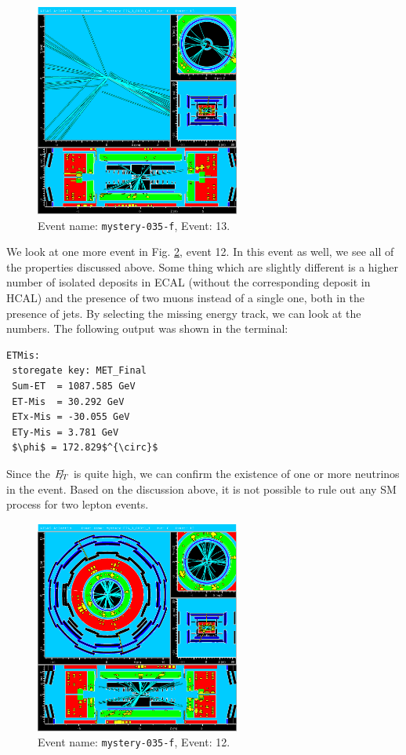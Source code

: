 \documentclass[a4paper]{report}
\numberwithin{equation}{section}
\begin{document}
\begin{figure}[htpb]
    \centering
    \includegraphics[width=0.6\textwidth]{mystery-035_0_00013_f-YX-RZ-RZ-YX-2022-05-23-13-34-34}
    \caption{Event name: \texttt{mystery-035-f}, Event: 13.}
    \label{fig:mys1_2}
\end{figure}


We look at one more event in Fig. \ref{fig:mys3}, event 12. In this event as well, we see all of the properties discussed above. Some thing which are slightly different is a higher number of isolated deposits in ECAL (without the corresponding deposit in HCAL) and the presence of two muons instead of a single one, both in the presence of jets. By selecting the missing energy track, we can look at the numbers. The following output was shown in the terminal: 

\begin{lstlisting}
ETMis:
 storegate key: MET_Final
 Sum-ET  = 1087.585 GeV
 ET-Mis  = 30.292 GeV
 ETx-Mis = -30.055 GeV
 ETy-Mis = 3.781 GeV
 $\phi$ = 172.829$^{\circ}$
 \end{lstlisting}

Since the $\slashed{E_T}$ is quite high, we can confirm the existence of one or more neutrinos in the event. Based on the discussion above, it is not possible to rule out any SM process for two lepton events. 


\begin{figure}[htpb]
    \centering
    \includegraphics[width=0.6\textwidth]{mystery-035_0_00051_f-YX-RZ-RZ-YX-2022-06-18-17-20-41}
    \caption{Event name: \texttt{mystery-035-f}, Event: 12.}
    \label{fig:mys3}
\end{figure}

\printbibliography
\end{document}
